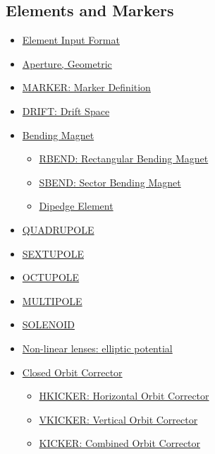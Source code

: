 




\subsection{Elements and Markers}


\begin{itemize}
	\item \href{elm_format.html}{Element Input Format}
	\item \href{aperture.html}{Aperture, Geometric}
	\item \href{marker.html}{MARKER: Marker Definition}
	\item \href{drift.html}{DRIFT: Drift Space}
	\item \href{bend.html}{Bending Magnet}
\begin{itemize}
	\item \href{bend.html#rbend}{RBEND: Rectangular Bending Magnet}
	\item \href{bend.html#sbend}{SBEND: Sector Bending Magnet}
	\item \href{dipedge.html}{Dipedge Element}
\end{itemize}
	\item \href{quadrupole.html}{QUADRUPOLE}
	\item \href{sextupole.html}{SEXTUPOLE}
	\item \href{octupole.html}{OCTUPOLE}
	\item \href{multipole.html}{MULTIPOLE}
	\item \href{solenoid.html}{SOLENOID}
	\item \href{nllens.html}{Non-linear lenses: elliptic potential}
	\item \href{kickers.html}{Closed Orbit Corrector}
\begin{itemize}
	\item \href{kickers.html#hkick}{HKICKER: Horizontal Orbit Corrector}
	\item \href{kickers.html#vkick}{VKICKER: Vertical Orbit Corrector}
	\item \href{kickers.html#kick}{KICKER: Combined Orbit Corrector}

\end{itemize}
\end{itemize}
